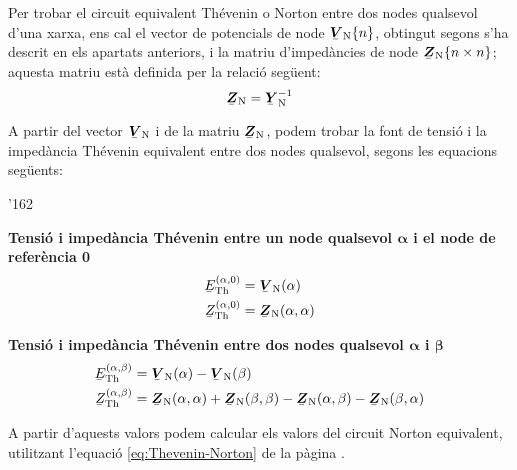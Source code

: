 Per trobar
el circuit equivalent Th\'{e}venin o Norton entre dos nodes qualsevol
d'una xarxa, ens cal el vector de potencials de node
$\mcmplx{V}\ped{N}\{n\}$, obtingut segons s'ha descrit en els
apartats anteriors, i la matriu d'imped\`{a}ncies de node
$\mcmplx{Z}\ped{N}\{n\times n\}$; aquesta matriu est\`{a} definida per
la relaci\'{o} seg\"{u}ent:
\begin{equation}
   \mcmplx{Z}\ped{N} = \mcmplx{Y}\ped{N}^{-1}
\end{equation}

A partir del vector $\mcmplx{V}\ped{N}$ i de la matriu $\mcmplx{Z}\ped{N}$, podem trobar la font de
tensi\'{o} i la imped\`{a}ncia Th\'{e}venin equivalent entre dos nodes qualsevol, segons les equacions seg\"{u}ents:

\begin{dinglist}{'162}
   \item \textbf{Tensi\'{o} i imped\`{a}ncia Th\'{e}venin entre un node qualsevol
                 ${\boldsymbol\alpha}$ i el node de refer\`{e}ncia 0}
   \begin{align}
      \cmplx{E}\ped{Th}^{(\alpha,0)} &= \mcmplx{V}\ped{N}(\alpha) \\
      \cmplx{Z}\ped{Th}^{(\alpha,0)} &= \mcmplx{Z}\ped{N}(\alpha,\alpha)
   \end{align}

   \item \textbf{Tensi\'{o} i imped\`{a}ncia Th\'{e}venin entre dos nodes qualsevol
                 ${\boldsymbol\alpha}$ i ${\boldsymbol\beta}$}
   \begin{align}
      \cmplx{E}\ped{Th}^{(\alpha,\beta)} &= \mcmplx{V}\ped{N}(\alpha) - \mcmplx{V}\ped{N}(\beta) \\
      \cmplx{Z}\ped{Th}^{(\alpha,\beta)} &= \mcmplx{Z}\ped{N}(\alpha,\alpha) +
      \mcmplx{Z}\ped{N}(\beta,\beta) - \mcmplx{Z}\ped{N}(\alpha,\beta) -
       \mcmplx{Z}\ped{N}(\beta,\alpha)
   \end{align}
\end{dinglist}

A partir d'aquests valors podem calcular els valors del circuit Norton equivalent, utilitzant l'equaci\'{o} \eqref{eq:Thevenin-Norton} de la p\`{a}gina \pageref{eq:Thevenin-Norton}.

